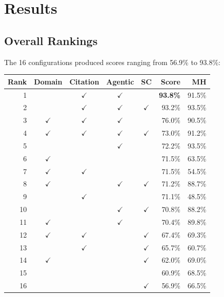 \documentclass[11pt,letterpaper]{article}
\begin{document}
\section{Results}

\subsection{Overall Rankings}

The 16 configurations produced scores ranging from 56.9\% to 93.8\%:

\begin{table}[H]
\centering
\small
\begin{tabular}{r c c c c r r}
\toprule
\textbf{Rank} & \textbf{Domain} & \textbf{Citation} & \textbf{Agentic} & \textbf{SC} & \textbf{Score} & \textbf{MH} \\
\midrule
1  &            & $\checkmark$ & $\checkmark$ &            & \textbf{93.8\%} & 91.5\% \\
2  &            & $\checkmark$ & $\checkmark$ & $\checkmark$ & 93.2\% & 93.5\% \\
3  & $\checkmark$ & $\checkmark$ & $\checkmark$ &            & 76.0\% & 90.5\% \\
4  & $\checkmark$ & $\checkmark$ & $\checkmark$ & $\checkmark$ & 73.0\% & 91.2\% \\
5  &            &            & $\checkmark$ &            & 72.2\% & 93.5\% \\
6  & $\checkmark$ &            &            &            & 71.5\% & 63.5\% \\
7  & $\checkmark$ & $\checkmark$ &            &            & 71.5\% & 54.5\% \\
8  & $\checkmark$ &            & $\checkmark$ & $\checkmark$ & 71.2\% & 88.7\% \\
9  &            & $\checkmark$ &            &            & 71.1\% & 48.5\% \\
10 &            &            & $\checkmark$ & $\checkmark$ & 70.8\% & 88.2\% \\
11 & $\checkmark$ &            & $\checkmark$ &            & 70.4\% & 89.8\% \\
12 & $\checkmark$ & $\checkmark$ &            & $\checkmark$ & 67.4\% & 69.3\% \\
13 &            & $\checkmark$ &            & $\checkmark$ & 65.7\% & 60.7\% \\
14 & $\checkmark$ &            &            & $\checkmark$ & 62.0\% & 69.0\% \\
15 &            &            &            &            & 60.9\% & 68.5\% \\
16 &            &            &            & $\checkmark$ & 56.9\% & 66.5\% \\
\bottomrule
\end{tabular}
\end{table}
\end{document}
